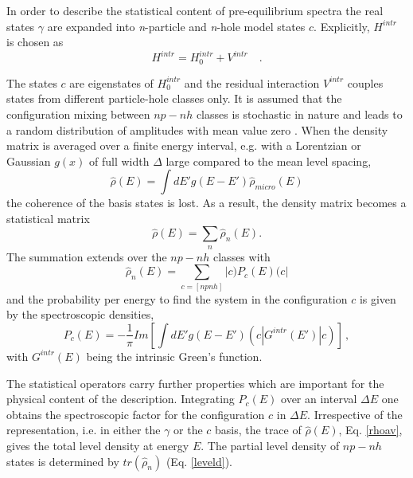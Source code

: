 \documentclass[twocolumn,amsmath,amssymb,10pt,groupedaddress,a4paper]{revtex4}
\begin{document}
In order to describe the statistical content of pre-equilibrium spectra
the real states $\gamma$ are expanded into \emph{n}-particle and
\emph{n}-hole model states $c$. Explicitly, $H^{intr}$ is chosen
as
\begin{equation}
H^{intr}=H_{0}^{intr}+V^{intr}\quad.\label{hintr}
\end{equation}

\noindent The states $c$ are eigenstates of $H_{0}^{intr}$ and the residual
interaction $V^{intr}$ couples states from different particle-hole
classes only. It is assumed that the configuration mixing between
$np-nh$ classes is stochastic in nature and leads to a random distribution
of amplitudes with mean value zero \cite{LW92}. When the density
matrix is averaged over a finite energy interval, e.g. with a Lorentzian
or Gaussian $g(x)$ of full width $\Delta$ large compared to the
mean level spacing,
\begin{equation}
\hat{\rho}(E)=\int dE'g(E-E')\hat{\rho}_{micro}(E)\label{rhoav}
\end{equation}
\noindent the coherence of the basis states is lost. As a result, the density
matrix becomes a statistical matrix
\begin{equation}
\hat{\rho}(E)=\sum_{n}{\hat{\rho}_{n}(E)}.\label{levelc}
\end{equation}
\noindent The summation extends over the $np-nh$ classes with
\begin{equation}
\hat{\rho}_{n}(E)=\sum_{c=[npnh]}{|c)P_{c}(E)(c|}\label{leveld}
\end{equation}
\noindent and the probability per energy to find the system in the configuration
$c$ is given by the spectroscopic densities,
\begin{equation}
P_{c}(E)=-\frac{1}{\pi}Im[\int dE'g(E-E')(c|G^{intr}(E')|c)]\,,\label{specd}
\end{equation}
\noindent with $G^{intr}(E)$ being the intrinsic Green's function.

The statistical operators carry further properties which are important
for the physical content of the description. Integrating $P_{c}(E)$
over an interval $\Delta E$ one obtains the spectroscopic factor
for the configuration $c$ in $\Delta E$. Irrespective of the representation,
i.e. in either the $\gamma$ or the $c$ basis, the trace of $\hat{\rho}(E)$,
Eq. \ref{rhoav}, gives the total level density
at energy $E$. The partial level density of $np-nh$ states is determined
by $tr(\hat{\rho}_{n})$ (Eq. \ref{leveld}).
\end{document}
